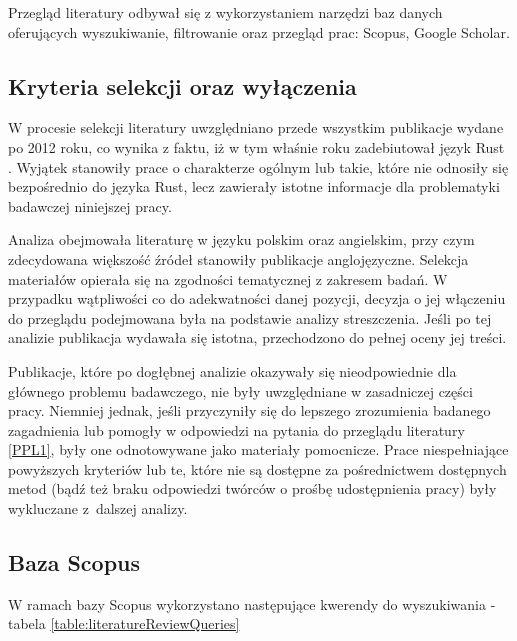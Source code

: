 Przegląd literatury odbywał się z wykorzystaniem narzędzi baz danych oferujących wyszukiwanie, filtrowanie oraz przegląd prac: Scopus, Google Scholar.

\subsection{Kryteria selekcji oraz wyłączenia}
\label{KryteriaSelekcji}
W procesie selekcji literatury uwzględniano przede wszystkim publikacje wydane po 2012 roku, co wynika z faktu, iż w tym właśnie roku zadebiutował język Rust \cite{wikipediaRustprogramming}. Wyjątek stanowiły prace o charakterze ogólnym lub takie, które nie odnosiły się bezpośrednio do języka Rust, lecz zawierały istotne informacje dla problematyki badawczej niniejszej pracy.

Analiza obejmowała literaturę w języku polskim oraz angielskim, przy czym zdecydowana większość źródeł stanowiły publikacje anglojęzyczne. Selekcja materiałów opierała się na zgodności tematycznej z zakresem badań. W przypadku wątpliwości co do adekwatności danej pozycji, decyzja o jej włączeniu do przeglądu podejmowana była na podstawie analizy streszczenia. Jeśli po tej analizie publikacja wydawała się istotna, przechodzono do pełnej oceny jej treści.

Publikacje, które po dogłębnej analizie okazywały się nieodpowiednie dla głównego problemu badawczego, nie były uwzględniane w zasadniczej części pracy. Niemniej jednak, jeśli przyczyniły się do lepszego zrozumienia badanego zagadnienia lub pomogły w odpowiedzi na pytania do przeglądu literatury \ref{PPL1}, były one odnotowywane jako materiały pomocnicze. Prace niespełniające powyższych kryteriów lub te, które nie są dostępne za pośrednictwem dostępnych metod (bądź też braku odpowiedzi twórców o prośbę udostępnienia pracy) były wykluczane z~dalszej analizy.


\subsection{Baza Scopus}
W ramach bazy Scopus wykorzystano następujące kwerendy do wyszukiwania - tabela \ref{table:literatureReviewQueries}

